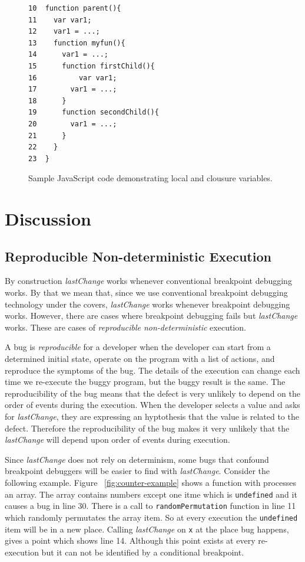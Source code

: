 \documentclass[preprint]{sigplanconf}
\begin{document}
\begin{figure}[htp]
\begin{verbatim}
10  function parent(){
11    var var1;
12    var1 = ...;
13    function myfun(){
14      var1 = ...;
15      function firstChild(){
16       	var var1;
17        var1 = ...;
18      }  
19      function secondChild(){
20        var1 = ...;			      
21      }
22    }  
23  }    
\end{verbatim}
\caption{Sample JavaScript code demonstrating local and clousure variables.}
\label{fig:js-closure}
\end{figure}
  

\section{Discussion}



\subsection{Reproducible Non-deterministic Execution}

By construction \textit{lastChange} works whenever conventional
breakpoint debugging works. By that we mean that, since we use
conventional breakpoint debugging technology under the covers,
\textit{lastChange} works whenever breakpoint debugging
works. However, there are cases where breakpoint debugging fails but
\textit{lastChange} works.  These are cases of \textit{reproducible
  non-deterministic} execution.

A bug is \textit{reproducible} for a developer when the developer can
start from a determined initial state, operate on the program with a
list of actions, and reproduce the symptoms of the bug. The details of
the execution can change each time we re-execute the buggy program,
but the buggy result is the same.  The reproducibility of the bug
means that the defect is very unlikely to depend on the order of
events during the execution. When the developer selects a value and
asks for \textit{lastChange}, they are expressing an hyptothesis that
the value is related to the defect. Therefore the reproducibility of
the bug makes it very unlikely that the \textit{lastChange} will
depend upon order of events during execution.

Since \textit{lastChange} does not rely on determinism, some bugs that
confound breakpoint debuggers will be easier to find with
\textit{lastChange}.  Consider the following example.
Figure ~\ref{fig:counter-example} shows a function with processes an
array. The array contains numbers except one itme which is
\texttt{undefined} and it causes a bug in line 30. There is a call to
\texttt{randomPermutation} function in line 11 which randomly
permutates the array item. So at every execution the
\texttt{undefined} item will be in a new place. Calling
\textit{lastChange} on \texttt{x} at the place bug happens, gives a
point which shows line 14. Although this point exists at every
re-execution but it can not be identified by a conditional breakpoint.
\end{document}
